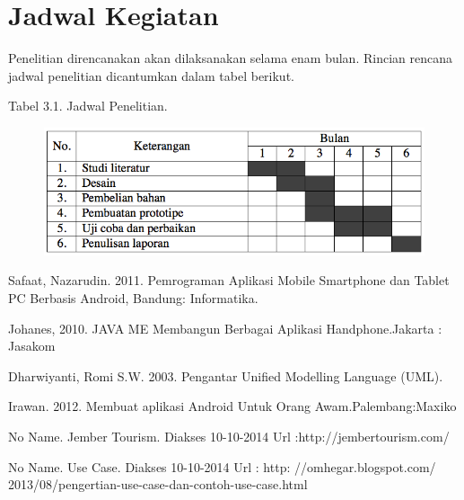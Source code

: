 \documentclass{jtetiproposalskripsi}
\begin{document}
\section{Jadwal Kegiatan}
Penelitian direncanakan akan dilaksanakan selama enam bulan. Rincian rencana jadwal penelitian dicantumkan dalam tabel berikut.

\begin{center}
Tabel 3.1. Jadwal Penelitian.
\end{center}
\vspace{-0.5cm}
\begin{figure}[ht!]
  \centering
    \includegraphics[width=13cm]{gambar/timeline}
\end{figure}


\begin{thebibliography}{9}

Safaat, Nazarudin. 2011. Pemrograman Aplikasi Mobile Smartphone dan Tablet PC Berbasis Android, Bandung: Informatika.

Johanes, 2010. JAVA ME Membangun Berbagai Aplikasi Handphone.Jakarta : Jasakom 

Dharwiyanti, Romi S.W. 2003. Pengantar Unified Modelling Language (UML).

Irawan. 2012. Membuat aplikasi Android Untuk Orang Awam.Palembang:Maxiko

No Name.  Jember Tourism. Diakses 10-10-2014 Url :http://jembertourism.com/

No Name. Use Case. Diakses 10-10-2014 Url : http: //omhegar.blogspot.com/ 2013/08/pengertian-use-case-dan-contoh-use-case.html


\end{thebibliography}
\end{document}
